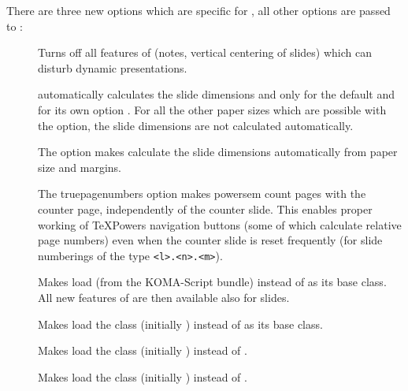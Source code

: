 \documentclass[12pt]{scrartcl}
\let\newslide=\relax
\begin{document}
\newslide

There are three new options which are specific for , all other options are passed to :
\begin{description}
\item[]
  Turns off all features of  (notes, vertical centering of slides)
  which can disturb dynamic presentations.

\item[]
   automatically calculates the slide dimensions
   and  only for the default  and for its own option
  . For all the other paper sizes which are possible with the  option, the slide dimensions are not
  calculated automatically.

  The  option makes  calculate the slide dimensions automatically from paper size
  and margins.

\newslide

\item[]
  The truepagenumbers option makes powersem count pages with the counter page, independently of the counter slide. This
  enables proper working of TeXPowers navigation buttons (some of which calculate relative page numbers) even when the
  counter slide is reset frequently (for slide numberings of the type \verb|<l>.<n>.<m>|).

\item[] Makes
   load  (from the KOMA-Script bundle) instead of
   as its base class. All new features of  are then available also for slides.

\item[]
  Makes  load the class  (initially ) instead of
   as its base class.

\item[]
  Makes  load the class  (initially ) instead of
  .

\item[]
  Makes  load the class  (initially ) instead of
  .

\end{description}
\end{document}
